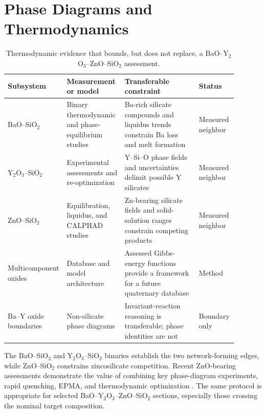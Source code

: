 \section{Phase Diagrams and Thermodynamics}\label{sec:thermo}

\begin{table}[t]
\centering
\caption{Thermodynamic evidence that bounds, but does not replace, a BaO--Y$_2$O$_3$--ZnO--SiO$_2$ assessment.}
\label{tab:thermo}
\begin{tabular}{P{0.18\linewidth}P{0.25\linewidth}P{0.32\linewidth}P{0.14\linewidth}}
\toprule
Subsystem & Measurement or model & Transferable constraint & Status \\
\midrule
BaO--SiO$_2$ & Binary thermodynamic and phase-equilibrium studies & Ba-rich silicate compounds and liquidus trends constrain Ba loss and melt formation & Measured neighbor \cite{shukla2018thermodynamic,zhang2016thermodynamic,tyurnina2008thermodynamic} \\
Y$_2$O$_3$--SiO$_2$ & Experimental assessments and re-optimization & Y--Si--O phase fields and uncertainties delimit possible Y silicates & Measured neighbor \cite{makrovets2023y2o3,zhi2022thermodynamic,qi2024thermodynamic} \\
ZnO--SiO$_2$ & Equilibration, liquidus, and CALPHAD studies & Zn-bearing silicate fields and solid-solution ranges constrain competing products & Measured neighbor \cite{shevchenko2019thermodynamic,jeon2025phase,dobrynenko2025solid} \\
Multicomponent oxides & Database and model architecture & Assessed Gibbs-energy functions provide a framework for a future quaternary database & Method \cite{decterov2018thermodynamic,bale2008factsage,sundman2018a} \\
Ba--Y oxide boundaries & Non-silicate phase diagrams & Invariant-reaction reasoning is transferable; phase identities are not & Boundary only \cite{kale1989phase,bryuzgina2022actual} \\
\bottomrule
\end{tabular}
\end{table}

The BaO--SiO$_2$ and Y$_2$O$_3$--SiO$_2$ binaries establish the two network-forming edges, while ZnO--SiO$_2$ constrains zincosilicate competition. Recent ZnO-bearing assessments demonstrate the value of combining key phase-diagram experiments, rapid quenching, EPMA, and thermodynamic optimization \cite{kim2025key,abdeyazdan2024phase,jeon2025phase,lee2025coupled}. The same protocol is appropriate for selected BaO--Y$_2$O$_3$--ZnO--SiO$_2$ sections, especially those crossing the nominal target composition.

